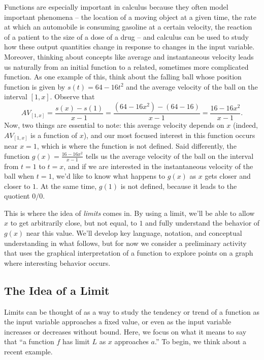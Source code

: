 Functions are especially important in calculus because they often model important phenomena -- the location of a moving object at a given time, the rate at which an automobile is consuming gasoline at a certain velocity, the reaction of a patient to the size of a dose of a drug -- and calculus can be used to study how these output quantities change in response to changes in the input variable.  Moreover, thinking about concepts like average and instantaneous velocity leads us naturally from an initial function to a related, sometimes more complicated function.  As one example of this, think about the falling ball whose position function is given by $s(t) = 64 - 16t^2$ and the average velocity of the ball on the interval $[1,x]$.  Observe that
\[ AV_{[1,x]} = \frac{s(x) - s(1)}{x-1} = \frac{(64-16x^2) - (64-16)}{x-1} = \frac{16 - 16x^2}{x-1}. \]
Now, two things are essential to note:  this average velocity depends on $x$ (indeed, $AV_{[1,x]}$ is a function of $x$), and our most focused interest in this function occurs near $x = 1$, which is where the function is not defined.  Said differently, the function $g(x) = \frac{16 - 16x^2}{x-1}$ tells us the average velocity of the ball on the interval from $t = 1$ to $t = x$, and if we are interested in the instantaneous velocity of the ball when $t = 1$, we'd like to know what happens to $g(x)$ as $x$ gets closer and closer to $1$.  At the same time, $g(1)$ is not defined, because it leads to the quotient $0/0$.

This is where the idea of \emph{limits} comes in.  By using a limit, we'll be able to allow $x$ to get arbitrarily close, but not equal, to $1$ and fully understand the behavior of $g(x)$ near this value.  We'll develop key language, notation, and conceptual understanding in what follows, but for now we consider a preliminary activity that uses the graphical interpretation of a function to explore points on a graph where interesting behavior occurs.


\subsection*{The Idea of a Limit}

Limits can be thought of as a way to study the tendency or trend of a function as the input variable approaches a fixed value, or even as the input variable increases or decreases without bound.  Here, we focus on what it means to say that ``a function $f$ has limit $L$ as $x$ approaches $a$.''  To begin, we think about a recent example.

